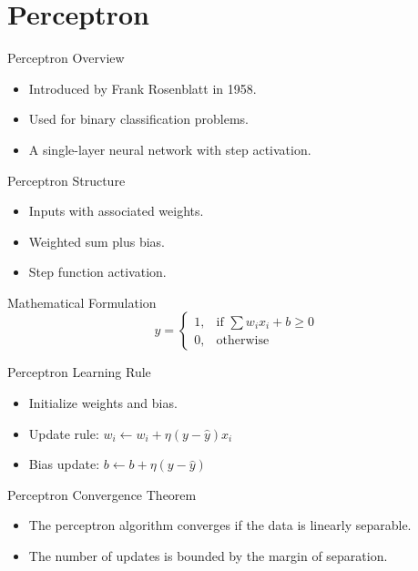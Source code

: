 \documentclass[11pt]{beamer}
\begin{document}
\section{Perceptron}
\begin{frame}{Perceptron Overview}
    \begin{itemize}
        \item Introduced by Frank Rosenblatt in 1958.
        \item Used for binary classification problems.
        \item A single-layer neural network with step activation.
    \end{itemize}
\end{frame}

\begin{frame}{Perceptron Structure}
    \begin{itemize}
        \item Inputs with associated weights.
        \item Weighted sum plus bias.
        \item Step function activation.
    \end{itemize}
\end{frame}

\begin{frame}{Mathematical Formulation}
    $$ y = \begin{cases} 1, & \text{if } \sum w_i x_i + b \geq 0 \\ 0, & \text{otherwise} \end{cases} $$
\end{frame}

\begin{frame}{Perceptron Learning Rule}
    \begin{itemize}
        \item Initialize weights and bias.
        \item Update rule: $ w_i \leftarrow w_i + \eta (y - \hat{y}) x_i $
        \item Bias update: $ b \leftarrow b + \eta (y - \hat{y}) $
    \end{itemize}
\end{frame}

\begin{frame}{Perceptron Convergence Theorem}
    \begin{itemize}
        \item The perceptron algorithm converges if the data is linearly separable.
        \item The number of updates is bounded by the margin of separation.
    \end{itemize}
\end{frame}
\end{document}
